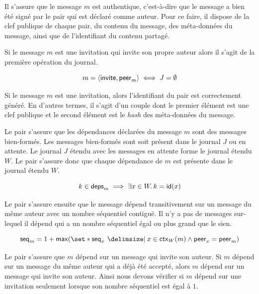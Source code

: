
Il s'assure que le message $m$ est authentique, c'est-à-dire que le message a bien été signé par le pair qui est déclaré comme auteur.
Pour ce faire, il dispose de la clef publique de chaque pair, du contenu du message, des méta-données du message, ainsi que de l'identifiant du contenu partagé.

Si le message $m$ est une invitation qui invite son propre auteur alors il s'agit de la première opération du journal.

\begin{equation*}
    m = \tuple*{\trm{invite}, \trm{peer}_m} \iff J = \emptyset %
\end{equation*}

Si le message $m$ est une invitation, alors l'identifiant du pair est correctement généré.
En d'autres termes, il s'agit d'un couple dont le premier élément est une clef publique et le second élément est le \emph{hash} des méta-données du message.

Le pair s'assure que les dépendances déclarées du message $m$ sont des messages bien-formés.
Les messages bien-formés sont soit présent dans le journal $J$ ou en attente.
Le journal $J$ étendu avec les messages en attente forme le journal étendu $W$.
Le pair s'assure donc que chaque dépendance de $m$ est présente dans le journal étendu $W$.

\begin{equation*}
    k \in \operatorname{\mathsf{deps}}_m \implies \exists x \in W \ldotp k = \operatorname{\mathsf{id}}(x)
\end{equation*}

Le pair s'assure ensuite que le message dépend transitivement sur un message du même auteur avec un nombre séquentiel contiguë.
Il n'y a pas de messages sur-lequel il dépend qui a un nombre séquentiel égal ou plus grand que le sien.

\begin{equation*}
    \trm{seq}_m = 1 + \trm{max}(\set*{\trm{seq}_x \given x \in \trm{ctx}_W(m) \land \trm{peer}_x = \trm{peer}_m})
\end{equation*}

Le pair s'assure que $m$ dépend sur un message qui invite son auteur.
Si $m$ dépend sur un message du même auteur qui a déjà été accepté, alors $m$ dépend sur un message qui invite son auteur.
Ainsi nous devons vérifier si $m$ dépend sur une invitation seulement lorsque son nombre séquentiel est égal à $1$.

